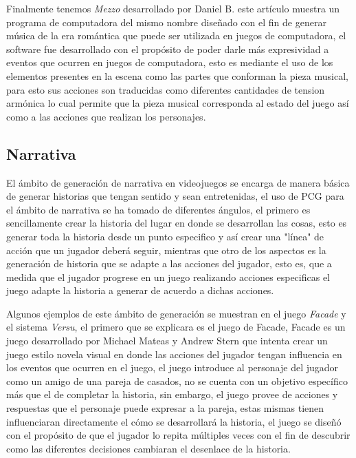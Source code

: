 Finalmente tenemos \textit{Mezzo} desarrollado por Daniel B. \cite{brown2012mezzo} este artículo muestra
un programa de computadora del mismo nombre diseñado con el fin de generar
música de la era romántica que puede ser utilizada en juegos de computadora, el
software fue desarrollado con el propósito de poder darle más expresividad a
eventos que ocurren en juegos de computadora, esto es mediante el uso de los
elementos presentes en la escena como las partes que conforman la pieza musical,
para esto sus acciones son traducidas como diferentes cantidades de tension
armónica lo cual permite que la pieza musical corresponda al estado del juego
así como a las acciones que realizan los personajes.

\subsection{Narrativa}
\label{subsection:Narrative}

El ámbito de generación de narrativa en videojuegos se encarga de manera básica
de generar historias que tengan sentido y sean entretenidas, el uso de PCG para
el ámbito de narrativa se ha tomado de diferentes ángulos, el primero es
sencillamente crear la historia del lugar en donde se desarrollan las cosas,
esto es generar toda la historia desde un punto especifico y así crear una
"línea" de acción que un jugador deberá seguir, mientras que otro de los
aspectos es la generación de historia que se adapte a las acciones del jugador,
esto es, que a medida que el jugador progrese en un juego realizando acciones
especificas el juego adapte la historia a generar de acuerdo a dichas acciones.

Algunos ejemplos de este ámbito de generación se muestran en el juego
\textit{Facade} y el sistema \textit{Versu}, el primero que se explicara es el
juego de Facade, Facade es un juego desarrollado por Michael Mateas y Andrew
Stern \cite{mateas2003faccade} que intenta crear un juego estilo novela visual
en donde las acciones del jugador tengan influencia en los eventos que ocurren
en el juego, el juego introduce al personaje del jugador como un amigo de una
pareja de casados, no se cuenta con un objetivo específico más que el de
completar la historia, sin embargo, el juego provee de acciones y respuestas que
el personaje puede expresar a la pareja, estas mismas tienen influenciaran
directamente el cómo se desarrollará la historia, el juego se diseñó con el
propósito de que el jugador lo repita múltiples veces con el fin de descubrir
como las diferentes decisiones cambiaran el desenlace de la historia. 

